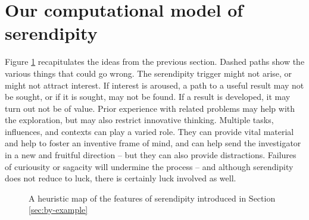 \section{Our computational model of serendipity} \label{sec:our-model}

Figure \ref{model-diagram} recapitulates the ideas from the previous
section.  Dashed paths show the various things that could go wrong.
The serendipity trigger might not arise, or might not attract
interest.  If interest is aroused, a path to a useful result may not
be sought, or if it is sought, may not be found.  If a result is
developed, it may turn out not be of value.  Prior experience with
related problems may help with the exploration, but may also restrict
innovative thinking.  Multiple tasks, influences, and contexts can
play a varied role. They can provide vital material and help to foster
an inventive frame of mind, and can help send the investigator in a
new and fruitful direction -- but they can also provide distractions.
Failures of curiousity or sagacity will undermine the process -- and
although serendipity does not reduce to luck, there is certainly luck
involved as well.

\begin{figure}[h!]
{\centering
{}}
\vspace{-.5cm}
\caption{A heuristic map of the features of serendipity introduced in Section \ref{sec:by-example}}
\label{model-diagram}
\end{figure}

